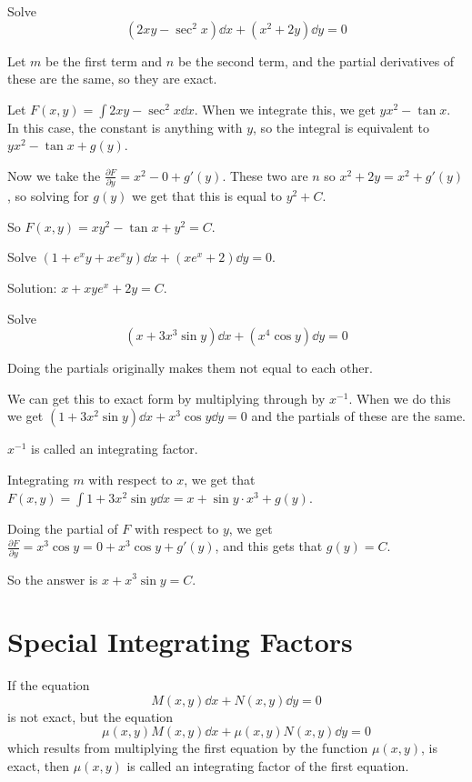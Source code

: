 \documentclass[../diffeq.tex]{subfiles}
\begin{document}
\begin{example}
    Solve 
    \[ (2xy-\sec^2 x)\dd x + (x^2+2y)\dd y = 0 \]

    Let $m$ be the first term and $n$ be the second term, and the partial derivatives of these are the same, so they are exact.

    Let $F(x,y)=\int 2xy-\sec^2 x \dd x$. When we integrate this, we get $yx^2-\tan x$. In this case, the constant is anything with $y$, so the integral is equivalent to 
    $yx^2-\tan x + g(y)$.

    Now we take the $\frac{\partial F}{\partial y} = x^2-0+g'(y)$. These two are $n$ so $x^2+2y=x^2+g'(y)$, so solving for $g(y)$ we get that this is equal to $y^2+C$.

    So $F(x,y)=xy^2-\tan x + y^2 = C$.
\end{example}

\ex Solve $(1+e^xy+xe^xy)\dd x + (xe^x+2)\dd y = 0$.

Solution: $x+xye^x+2y=C$.

\begin{example}
    Solve 
    \[ (x+3x^3\sin y)\dd x+(x^4\cos y)\dd y = 0 \]

    Doing the partials originally makes them not equal to each other.
    
    We can get this to exact form by multiplying through by $x^{-1}$. When we do this we get $(1+3x^2\sin y)\dd x+x^3\cos y \dd y = 0$ and the partials of these are the same.

    $x^{-1}$ is called an integrating factor.

    Integrating $m$ with respect to $x$, we get that $F(x,y)=\int 1+3x^2\sin y\dd x = x+\sin y\cdot x^3 + g(y)$.

    Doing the partial of $F$ with respect to $y$, we get $\frac{\partial F}{\partial y}=x^3\cos y = 0 + x^3\cos y + g'(y)$, and this gets that $g(y)=C$.

    So the answer is $x+x^3\sin y = C$.
\end{example}

\section{Special Integrating Factors}
\begin{definition}
    If the equation 
    \[ M(x,y)\dd x + N(x,y)\dd y = 0\]
    is not exact, but the equation 
    \[ \mu(x,y)M(x,y)\dd x + \mu(x,y)N(x,y)\dd y = 0 \]
    which results from multiplying the first equation by the function $\mu(x,y)$, is exact, then $\mu(x,y)$ is called an integrating factor of the first equation.
\end{definition}
\end{document}
